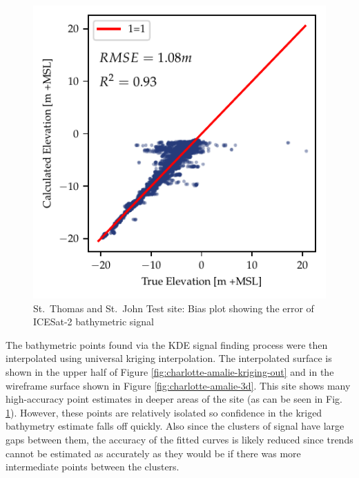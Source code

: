 \begin{figure}[htbp]
    \centering
    \includegraphics{figures/charlotteamalie_lidar_estimated_vs_truth.pdf}
    \caption{St.~Thomas and St.~John Test site: Bias plot showing the error of ICESat-2 bathymetric signal}
    \label{fig:charlotte-amalie-biasplot}
\end{figure}

The bathymetric points found via the KDE signal finding process were then interpolated using universal kriging interpolation. The interpolated surface is shown in the upper half of Figure \ref{fig:charlotte-amalie-kriging-out} and in the wireframe surface shown in Figure \ref{fig:charlotte-amalie-3d}. This site shows many high-accuracy point estimates in deeper areas of the site (as can be seen in Fig. \ref{fig:charlotte-amalie-biasplot}). However, these points are relatively isolated so confidence in the kriged bathymetry estimate falls off quickly. Also since the clusters of signal have large gaps between them, the accuracy of the fitted curves is likely reduced since trends cannot be estimated as accurately as they would be if there was more intermediate points between the clusters.

